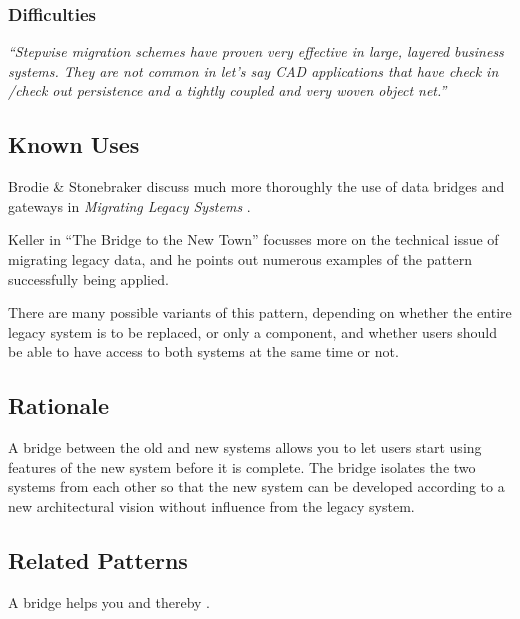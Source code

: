 \documentclass[a4paper,10pt,twoside]{book}
\begin{document}
\subsubsection*{Difficulties}

\begin{bulletlist}
\item \emph{``Stepwise migration schemes have proven very effective in large, layered business systems. They are not common in let's say CAD applications that have check in /check out persistence and a tightly coupled and very woven object net.''} \cite{Kell00a}
\end{bulletlist}

\subsection*{Known Uses}

Brodie \& Stonebraker discuss much more thoroughly the use of data bridges and gateways in \emph{Migrating Legacy Systems} \cite{Brod95a}. 

Keller in ``The Bridge to the New Town'' \cite{Kell00a} focusses more on the technical issue of migrating legacy data, and he points out numerous examples of the pattern successfully being applied.

There are many possible variants of this pattern, depending on whether the entire legacy system is to be replaced, or only a component, and whether users should be able to have access to both systems at the same time or not.

\subsection*{Rationale}

A bridge between the old and new systems allows you to let users start using features of the new system before it is complete. The bridge isolates the two systems from each other so that the new system can be developed according to a new architectural vision without influence from the legacy system.

\subsection*{Related Patterns}

A bridge helps you  and thereby .
\end{document}
